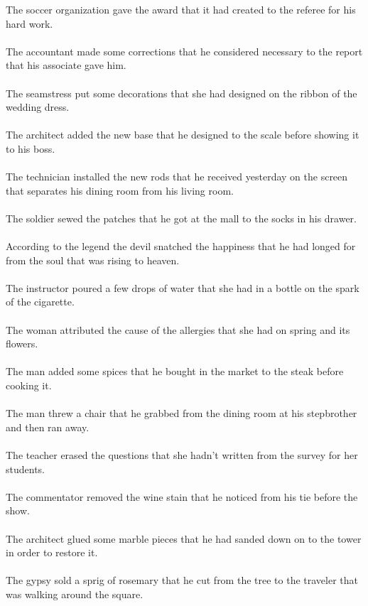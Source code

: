 The soccer organization gave the award that it had created to the referee for his hard work.	\\	\\
The accountant made some corrections that he considered necessary to the report that his associate gave him.	\\	\\
The seamstress put some decorations that she had designed on the ribbon of the wedding dress.	\\	\\
The architect added the new base that he designed to the scale before showing it to his boss.	\\	\\
The technician installed the new rods that he received yesterday on the screen that separates his dining room from his living room.	\\	\\
The soldier sewed the patches that he got at the mall to the socks in his drawer.	\\	\\
According to the legend the devil snatched the happiness that he had longed for from the soul that was rising to heaven.	\\	\\
The instructor poured a few drops of water that she had in a bottle on the spark of the cigarette.	\\	\\
The woman attributed the cause of the allergies that she had on spring and its flowers.	\\	\\
The man added some spices that he bought in the market to the steak before cooking it.	\\	\\
The man threw a chair that he grabbed from the dining room at his stepbrother and then ran away.	\\	\\
The teacher erased the questions that she hadn't written from the survey for her students.	\\	\\
The commentator removed the wine stain that he noticed from his tie before the show.	\\	\\
The architect glued some marble pieces that he had sanded down on to the tower in order to restore it.	\\	\\
The gypsy sold a sprig of rosemary that he cut from the tree to the traveler that was walking around the square.	\\	\\
